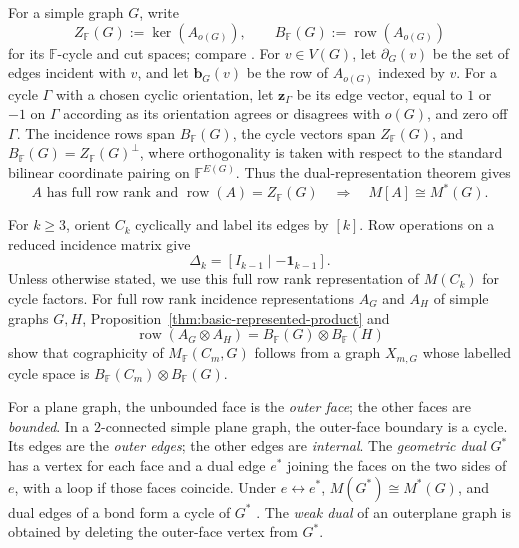 \documentclass[12pt,a4paper]{article}
\numberwithin{equation}{section}
\DeclareMathOperator{\row}{row}
\newcommand{\F}{\mathbb F}
\theoremstyle{definition}
\theoremstyle{remark}
\begin{document}
For a simple graph \(G\), write
\[
 Z_{\F}(G):=\ker(A_{o(G)}),\qquad
 B_{\F}(G):=\row(A_{o(G)})
\]
for its \(\F\)-cycle and cut spaces; compare
\cite[Chapters~4--5]{biggs-algebraic-graph-theory}.
For \(v\in V(G)\), let \(\partial_G(v)\) be the set of edges
incident with \(v\), and let \(\boldsymbol b_G(v)\) be the row of
\(A_{o(G)}\) indexed by \(v\).  For a cycle \(\Gamma\)
with a chosen cyclic orientation, let \(\boldsymbol z_\Gamma\) be
its edge vector, equal to \(1\) or \(-1\) on \(\Gamma\) according
as its orientation agrees or disagrees with \(o(G)\), and zero
off \(\Gamma\).  The incidence rows span \(B_{\F}(G)\), the cycle
vectors span \(Z_{\F}(G)\), and
\(B_{\F}(G)=Z_{\F}(G)^\perp\), where orthogonality is taken with
respect to the standard bilinear coordinate pairing on \(\F^{E(G)}\).
Thus the dual-representation
theorem \cite[Theorem~2.2.8 and Proposition~2.2.23]{oxley} gives
\begin{equation}\label{eq:cycle-space-dual-representation}
 A\text{ has full row rank and }\row(A)=Z_{\F}(G)
 \quad\Longrightarrow\quad
 M[A]\cong M^*(G).
\end{equation}

For \(k\ge3\), orient \(C_k\) cyclically and label its edges by
\([k]\).  Row operations on a reduced incidence matrix give
\begin{equation}\label{eq:cycle-incidence-matrix}
 \Delta_k=[I_{k-1}\mid-\boldsymbol{1}_{k-1}].
\end{equation}
Unless otherwise stated, we use this full row rank representation
of \(M(C_k)\) for cycle factors.  For full row rank incidence representations \(A_G\)
and \(A_H\) of simple graphs \(G,H\),
Proposition~\ref{thm:basic-represented-product} and
\[
 \row(A_G\otimes A_H)=B_{\F}(G)\otimes B_{\F}(H)
\]
show that cographicity of \(M_{\F}(C_m,G)\) follows from a graph
\(X_{m,G}\) whose labelled cycle space is
\(B_{\F}(C_m)\otimes B_{\F}(G)\).

For a plane graph, the unbounded face is the \emph{outer face}; the
other faces are \emph{bounded}.  In a \(2\)-connected simple plane
graph, the outer-face boundary is a cycle.  Its edges are the
\emph{outer edges}; the other edges are \emph{internal}.  The
\emph{geometric dual} \(G^*\) has a vertex for each face and a dual
edge \(e^*\) joining the faces on the two sides of \(e\), with a
loop if those faces coincide.  Under \(e\leftrightarrow e^*\),
\(M(G^*)\cong M^*(G)\), and dual edges of a bond form a cycle of
\(G^*\) \cite[Proposition~5.2.1]{oxley}.  The \emph{weak dual} of an
outerplane graph is obtained by deleting the outer-face vertex from
\(G^*\).
\end{document}
